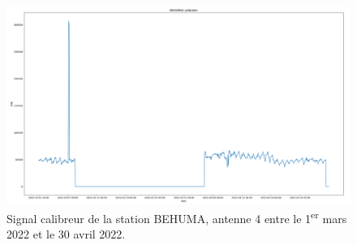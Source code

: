\documentclass[11pt]{article}
\begin{document}
\begin{figure}[t]
    \begin{center}
        \includegraphics[scale=0.235]{BEHUMA4_2022-03-01_2022-04-30_calibrator.png}
        \caption{Signal calibreur de la station BEHUMA, antenne 4 entre le 1\textsuperscript{er} mars 2022 et le 30 avril 2022.}
        \label{fig:BEHUMA1-anomalie}
    \end{center}
\end{figure}
\end{document}
